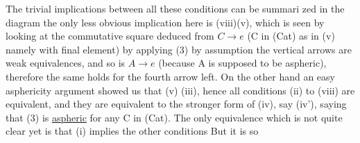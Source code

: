 The trivial implications between all these conditions can be summari
zed in the diagram
the only  less obvious implication here is (viii)\hand{$\Rightarrow$}(v), which is seen
by looking at the commutative square deduced from $C \to e$ (C in (Cat) as in
(v)\xout{\unsure{,}} namely with final element) by applying (3)
by assumption the vertical arrows are weak equivalences, and so is $A \to e$
(because A is supposed to be aspheric), therefore the same holds for the
fourth arrow left. On the other hand an easy asphericity argument
showed us \inserted{[3.30]} that (v) \hand{$\Longrightarrow$}(iii), hence all conditions (ii) to (viii) are
equivalent, and they are equivalent to the stronger form of (iv), 
say (iv'), saying that (3) is \uline{aspheric} for any C in (Cat). The only
equivalence which is not quite clear yet is that (i) implies the other
conditions  But it is so
